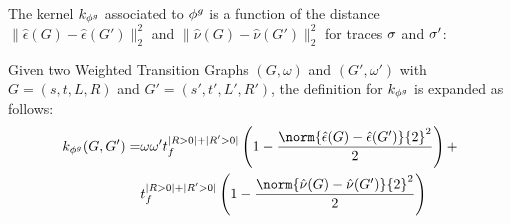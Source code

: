 %
%
The kernel $k_{{\phi^{g}}}$ associated to ${\phi^{g}}$ is {a function of the distance  $\|\hat{\epsilon}(G)-\hat{\epsilon}(G')\|_2^2$ and $\|\hat{\nu}(G)-\hat{\nu}(G')\|_2^2$ for traces $\sigma$ and ${{\sigma'}}$:}
%
\begin{proposition}\label{lem:rewritinglemma}
Given {two Weighted Transition Graphs} $(G,\omega)$ and $(G',\omega')$ with $G=(s,t,L,R)$ and $G'=(s',t',L',R')$, the definition for $k_{\phi^{g}}$ is expanded as follows:
$$\begin{aligned}
k_{\gorgembed}(G,G')=&\omega\omega't_f^{|R>0|+|R'>0|}\left(1-\frac{\norm{\hat{\epsilon}(G)-\hat{\epsilon}(G')}{2}^2}{2}\right)+\\
&t_f^{|R>0|+|R'>0|}\left(1-\frac{\norm{\hat{\nu}(G)-\hat{\nu}(G')}{2}^2}{2}\right)
\end{aligned}$$

\end{proposition}
